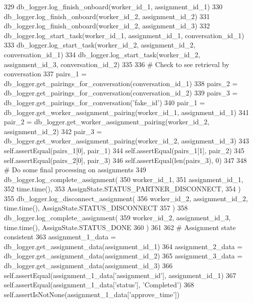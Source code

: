 \begin{DoxyCode}
329         db\_logger.log\_finish\_onboard(worker\_id\_1, assignment\_id\_1)
330         db\_logger.log\_finish\_onboard(worker\_id\_2, assignment\_id\_2)
331         db\_logger.log\_finish\_onboard(worker\_id\_2, assignment\_id\_3)
332         db\_logger.log\_start\_task(worker\_id\_1, assignment\_id\_1, conversation\_id\_1)
333         db\_logger.log\_start\_task(worker\_id\_2, assignment\_id\_2, conversation\_id\_1)
334         db\_logger.log\_start\_task(worker\_id\_2, assignment\_id\_3, conversation\_id\_2)
335 
336         \textcolor{comment}{# Check to see retrieval by conversation}
337         pairs\_1 = db\_logger.get\_pairings\_for\_conversation(conversation\_id\_1)
338         pairs\_2 = db\_logger.get\_pairings\_for\_conversation(conversation\_id\_2)
339         pairs\_3 = db\_logger.get\_pairings\_for\_conversation(\textcolor{stringliteral}{'fake\_id'})
340         pair\_1 = db\_logger.get\_worker\_assignment\_pairing(worker\_id\_1, assignment\_id\_1)
341         pair\_2 = db\_logger.get\_worker\_assignment\_pairing(worker\_id\_2, assignment\_id\_2)
342         pair\_3 = db\_logger.get\_worker\_assignment\_pairing(worker\_id\_2, assignment\_id\_3)
343         self.assertEqual(pairs\_1[0], pair\_1)
344         self.assertEqual(pairs\_1[1], pair\_2)
345         self.assertEqual(pairs\_2[0], pair\_3)
346         self.assertEqual(len(pairs\_3), 0)
347 
348         \textcolor{comment}{# Do some final processing on assignments}
349         db\_logger.log\_complete\_assignment(
350             worker\_id\_1,
351             assignment\_id\_1,
352             time.time(),
353             AssignState.STATUS\_PARTNER\_DISCONNECT,
354         )
355         db\_logger.log\_disconnect\_assignment(
356             worker\_id\_2, assignment\_id\_2, time.time(), AssignState.STATUS\_DISCONNECT
357         )
358         db\_logger.log\_complete\_assignment(
359             worker\_id\_2, assignment\_id\_3, time.time(), AssignState.STATUS\_DONE
360         )
361 
362         \textcolor{comment}{# Assignment state consistent}
363         assignment\_1\_data = db\_logger.get\_assignment\_data(assignment\_id\_1)
364         assignment\_2\_data = db\_logger.get\_assignment\_data(assignment\_id\_2)
365         assignment\_3\_data = db\_logger.get\_assignment\_data(assignment\_id\_3)
366         self.assertEqual(assignment\_1\_data[\textcolor{stringliteral}{'assignment\_id'}], assignment\_id\_1)
367         self.assertEqual(assignment\_1\_data[\textcolor{stringliteral}{'status'}], \textcolor{stringliteral}{'Completed'})
368         self.assertIsNotNone(assignment\_1\_data[\textcolor{stringliteral}{'approve\_time'}])

\end{DoxyCode}

